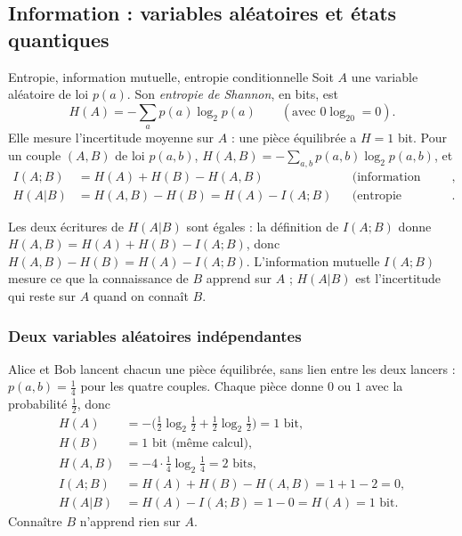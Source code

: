 \subsection{Information : variables aléatoires et états quantiques}\label{sec:info}

\begin{definition}{Entropie, information mutuelle, entropie conditionnelle}
Soit $A$ une variable aléatoire de loi $p(a)$. Son \emph{entropie de Shannon}, en bits, est
\[
  H(A)=-\sum_a p(a)\log_2p(a)\qquad(\text{avec }0\log_20=0).
\]
Elle mesure l'incertitude moyenne sur $A$ : une pièce équilibrée a $H=1$ bit. Pour un couple
$(A,B)$ de loi $p(a,b)$, $H(A,B)=-\sum_{a,b}p(a,b)\log_2p(a,b)$, et
\begin{align*}
  I(A;B)&=H(A)+H(B)-H(A,B) &&\text{(information mutuelle)},\\
  H(A|B)&=H(A,B)-H(B)=H(A)-I(A;B) &&\text{(entropie conditionnelle)}.
\end{align*}
\end{definition}

Les deux écritures de $H(A|B)$ sont égales : la définition de $I(A;B)$ donne
$H(A,B)=H(A)+H(B)-I(A;B)$, donc $H(A,B)-H(B)=H(A)-I(A;B)$. L'information mutuelle $I(A;B)$
mesure ce que la connaissance de $B$ apprend sur $A$ ; $H(A|B)$ est l'incertitude qui reste sur
$A$ quand on connaît $B$.

\subsubsection{Deux variables aléatoires indépendantes}

Alice et Bob lancent chacun une pièce équilibrée, sans lien entre les deux lancers :
$p(a,b)=\frac14$ pour les quatre couples. Chaque pièce donne $0$ ou $1$ avec la probabilité $\frac12$, donc
\begin{align*}
  H(A)&=-\Big(\tfrac12\log_2\tfrac12+\tfrac12\log_2\tfrac12\Big)=1\text{ bit},\\
  H(B)&=1\text{ bit (même calcul)},\\
  H(A,B)&=-4\cdot\tfrac14\log_2\tfrac14=2\text{ bits},\\
  I(A;B)&=H(A)+H(B)-H(A,B)=1+1-2=0,\\
  H(A|B)&=H(A)-I(A;B)=1-0=H(A)=1\text{ bit}.
\end{align*}
Connaître $B$ n'apprend rien sur $A$.


